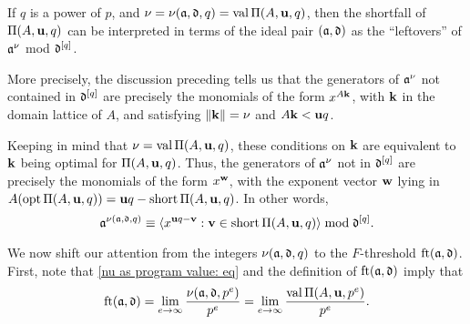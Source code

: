 \documentclass[11pt]{amsart}
\newcommand{\short}{\operatorname{short}}
\begin{document}
\begin{remark}
\label{shortfall motivation: R}
If $q$ is a power of $p$, and $\nu = \nu(\mathfrak{a},\mathfrak{d},q) = \operatorname{val} \Pi(A,\mathbf{u},q)$, then the shortfall of $\Pi(A,\mathbf{u},q)$ can be interpreted in terms of the ideal pair $(\mathfrak{a}, \mathfrak{d})$ as the ``leftovers'' of $\mathfrak{a}^\nu$ mod $\mathfrak{d}^{[q]}$.

More precisely, the discussion preceding  tells us that the generators of $\mathfrak{a}^{\nu}$ not contained in $\mathfrak{d}^{[q]}$ are precisely the monomials of the form $x^{A \mathbf{k}}$, with $\mathbf{k}$ in the domain lattice of $A$, and satisfying $\| \mathbf{k} \| = \nu$ and $A\mathbf{k}<\mathbf{u}q$.  

Keeping in mind that $\nu= \operatorname{val} \Pi(A, \mathbf{u}, q)$, these conditions on $\mathbf{k}$ are equivalent to $\mathbf{k}$ being optimal for $\Pi(A, \mathbf{u}, q)$.  Thus, the generators of $\mathfrak{a}^{\nu}$ not in $\mathfrak{d}^{[q]}$ are precisely the monomials of the form $x^{\mathbf{w}}$, with the exponent vector $\mathbf{w}$ lying in $A(\opt \IP(A, \vv{u}, q)) = \vv{u}q - \short \IP(A, \vv{u}, q)$.  In other words,
\begin{equation}
\label{algebraic shortfall PI general: e}
 \ideala^{\nu(\ideala, \ideald, q)} \equiv \ideal{x^{\vv{u}q-\vv{v}}: \vv{v} \in \short \IP(A,\vv{u},q)} \bmod \ideald^{[q]}.
 \end{equation}
\end{remark}



We now shift our attention from the integers $\nu(\mathfrak{a}, \mathfrak{d}, q)$ to the $F$-threshold $\operatorname{ft}(\mathfrak{a}, \mathfrak{d})$.  First, note that \eqref{nu as program value: eq} and the definition of $\operatorname{ft}(\mathfrak{a}, \mathfrak{d})$ imply that 
%
\begin{equation}
\label{ft as limit of normalized program values: eq}
\operatorname{ft}(\mathfrak{a}, \mathfrak{d}) = \lim_{e\to\infty} \frac{\nu(\mathfrak{a},\mathfrak{d},p^e)}{p^e} = \lim_{e\to\infty} \frac{\operatorname{val} \Pi(A,\mathbf{u},p^e)}{p^e}.
\end{equation}
\end{document}
